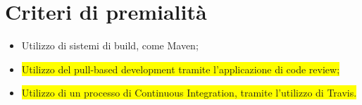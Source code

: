 \documentclass[12pt]{article}
\begin{document}
  \section{Criteri di premialità}
  
  \begin{itemize}
      \item Utilizzo di sistemi di build, come Maven;
      \item \colorbox{yellow}{Utilizzo del pull-based development tramite l’applicazione di code review;}
      \item \colorbox{yellow}{Utilizzo di un processo di Continuous Integration, tramite l’utilizzo di Travis.}
  \end{itemize}
\end{document}
